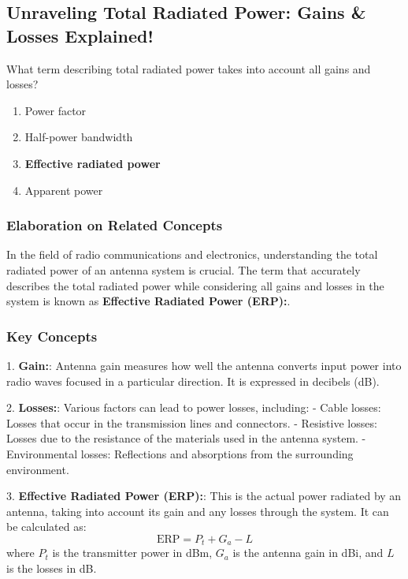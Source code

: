 \subsection{Unraveling Total Radiated Power: Gains \& Losses Explained!}

\begin{tcolorbox}[colback=gray!10, colframe=black, title=E9A03] What term describing total radiated power takes into account all gains and losses?
\begin{enumerate}[label=\Alph*.]
    \item Power factor
    \item Half-power bandwidth
    \item \textbf{Effective radiated power}
    \item Apparent power
\end{enumerate} \end{tcolorbox}

\subsubsection{Elaboration on Related Concepts}

In the field of radio communications and electronics, understanding the total radiated power of an antenna system is crucial. The term that accurately describes the total radiated power while considering all gains and losses in the system is known as \textbf{Effective Radiated Power (ERP):}.

\subsubsection{Key Concepts}

1. \textbf{Gain:}: Antenna gain measures how well the antenna converts input power into radio waves focused in a particular direction. It is expressed in decibels (dB).
  
2. \textbf{Losses:}: Various factors can lead to power losses, including:
   - Cable losses: Losses that occur in the transmission lines and connectors.
   - Resistive losses: Losses due to the resistance of the materials used in the antenna system.
   - Environmental losses: Reflections and absorptions from the surrounding environment.

3. \textbf{Effective Radiated Power (ERP):}: This is the actual power radiated by an antenna, taking into account its gain and any losses through the system. It can be calculated as:
   \[
   \text{ERP} = P_t + G_a - L
   \]
   where \( P_t \) is the transmitter power in dBm, \( G_a \) is the antenna gain in dBi, and \( L \) is the losses in dB.

